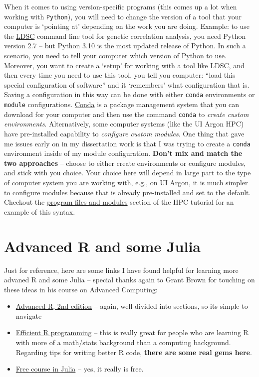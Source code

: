 \documentclass[
]{book}
\begin{document}
When it comes to using version-specific programs (this comes up a lot when working with \texttt{Python}), you will need to change the version of a tool that your computer is `pointing at' depending on the work you are doing. Example: to use the \href{https://github.com/bulik/ldsc/wiki/Heritability-and-Genetic-Correlation}{LDSC} command line tool for genetic correlation analysis, you need Python version 2.7 -- but Python 3.10 is the most updated release of Python. In such a scenario, you need to tell your computer which version of Python to use. Moreover, you want to create a `setup' for working with a tool like LDSC, and then every time you need to use this tool, you tell you computer: ``load this special configuration of software'' and it `remembers' what configuration that is. Saving a configuration in this way can be done with either \texttt{conda} environments or \texttt{module} configurations. \href{https://docs.conda.io/en/latest/}{Conda} is a package management system that you can download for your computer and then use the command \texttt{conda} to \emph{create custom environments}. Alternatively, some computer systems (like the UI Argon HPC) have pre-installed capability to \emph{configure custom modules}. One thing that gave me issues early on in my dissertation work is that I was trying to create a \texttt{conda} environment inside of my module configuration. \textbf{Don't mix and match the two approaches} -- choose to either create environments or configure modules, and stick with you choice. Your choice here will depend in large part to the type of computer system you are working with, e.g., on UI Argon, it is much simpler to configure modules because that is already pre-installed and set to the default. Checkout the \href{https://iowabiostat.github.io/hpc/3.html}{program files and modules} section of the HPC tutorial for an example of this syntax.

\hypertarget{advanced-r-and-some-julia}{%
\section{Advanced R and some Julia}\label{advanced-r-and-some-julia}}

Just for reference, here are some links I have found helpful for learning more advaned R and some Julia -- special thanks again to Grant Brown for touching on these ideas in his course on Advanced Computing:

\begin{itemize}
\item
  \href{https://adv-r.hadley.nz/}{Advanced R, 2nd edition} -- again, well-divided into sections, so its simple to navigate
\item
  \href{https://bookdown.org/csgillespie/efficientR/programming.html}{Efficient R programming} -- this is really great for people who are learning R with more of a math/stats background than a computing background. Regarding tips for writing better R code, \textbf{there are some real gems here}.
\item
  \href{https://juliaacademy.com/p/intro-to-julia}{Free course in Julia} -- yes, it really is free.
\end{itemize}
\end{document}
